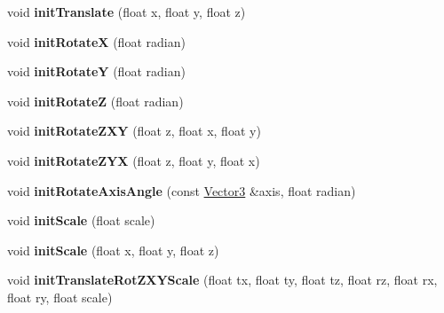 \begin{DoxyCompactItemize}
\item 
void {\bfseries init\+Translate} (float x, float y, float z)\hypertarget{class_magnum_1_1_matrix4_a3cbafa8546b9bb40b4e3fefad2060c8a}{}\label{class_magnum_1_1_matrix4_a3cbafa8546b9bb40b4e3fefad2060c8a}

\item 
void {\bfseries init\+RotateX} (float radian)\hypertarget{class_magnum_1_1_matrix4_a1602b73786b183d98d22beead9e79e7e}{}\label{class_magnum_1_1_matrix4_a1602b73786b183d98d22beead9e79e7e}

\item 
void {\bfseries init\+RotateY} (float radian)\hypertarget{class_magnum_1_1_matrix4_afd3bc6faacc5f0fc2cfa1e04e28d1d32}{}\label{class_magnum_1_1_matrix4_afd3bc6faacc5f0fc2cfa1e04e28d1d32}

\item 
void {\bfseries init\+RotateZ} (float radian)\hypertarget{class_magnum_1_1_matrix4_a1e963dca05feed815ecf66d8c8346a58}{}\label{class_magnum_1_1_matrix4_a1e963dca05feed815ecf66d8c8346a58}

\item 
void {\bfseries init\+Rotate\+Z\+XY} (float z, float x, float y)\hypertarget{class_magnum_1_1_matrix4_a1bd6a04e7e99aad7557a35d6383a7405}{}\label{class_magnum_1_1_matrix4_a1bd6a04e7e99aad7557a35d6383a7405}

\item 
void {\bfseries init\+Rotate\+Z\+YX} (float z, float y, float x)\hypertarget{class_magnum_1_1_matrix4_add4020087add92cb19c2d09dffd4d923}{}\label{class_magnum_1_1_matrix4_add4020087add92cb19c2d09dffd4d923}

\item 
void {\bfseries init\+Rotate\+Axis\+Angle} (const \hyperlink{class_magnum_1_1_vector3}{Vector3} \&axis, float radian)\hypertarget{class_magnum_1_1_matrix4_a25d3cfdfd2bfa0162c4508c72b95f5d2}{}\label{class_magnum_1_1_matrix4_a25d3cfdfd2bfa0162c4508c72b95f5d2}

\item 
void {\bfseries init\+Scale} (float scale)\hypertarget{class_magnum_1_1_matrix4_a9234a8bdc30fc6f45986cb8e06d2c755}{}\label{class_magnum_1_1_matrix4_a9234a8bdc30fc6f45986cb8e06d2c755}

\item 
void {\bfseries init\+Scale} (float x, float y, float z)\hypertarget{class_magnum_1_1_matrix4_a2191a5c0773e1f012ff997a8289da8a3}{}\label{class_magnum_1_1_matrix4_a2191a5c0773e1f012ff997a8289da8a3}

\item 
void {\bfseries init\+Translate\+Rot\+Z\+X\+Y\+Scale} (float tx, float ty, float tz, float rz, float rx, float ry, float scale)\hypertarget{class_magnum_1_1_matrix4_a1d5797189e531ef8bb9cb7cdeb0ad6a4}{}\label{class_magnum_1_1_matrix4_a1d5797189e531ef8bb9cb7cdeb0ad6a4}


\end{DoxyCompactItemize}
